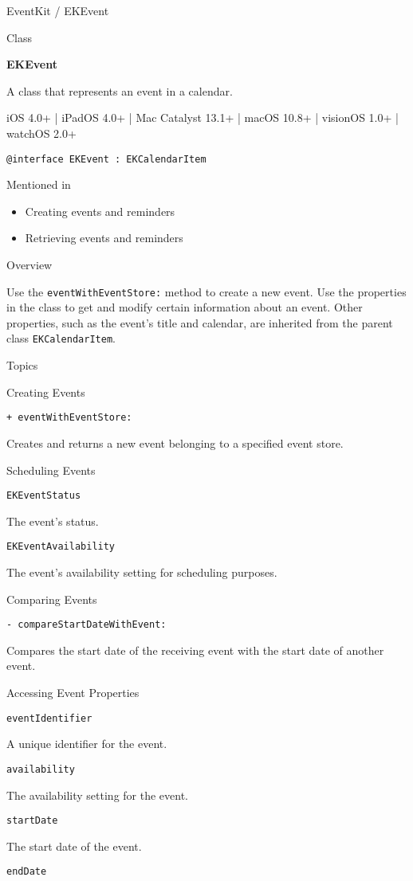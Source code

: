 \documentclass{article}
\title{}
\author{}
\date{}
\begin{document}
EventKit / EKEvent

Class

\textbf{EKEvent}

A class that represents an event in a calendar.

iOS 4.0+ | iPadOS 4.0+ | Mac Catalyst 13.1+ | macOS 10.8+ | visionOS 1.0+ | watchOS 2.0+

\texttt{@interface EKEvent : EKCalendarItem}

Mentioned in
\begin{itemize}
    \item Creating events and reminders
    \item Retrieving events and reminders
\end{itemize}

Overview

Use the \texttt{eventWithEventStore:} method to create a new event. Use the properties in the class to get and
modify certain information about an event. Other properties, such as the event's title and calendar, are inherited
from the parent class \texttt{EKCalendarItem}.

Topics

Creating Events

\texttt{+ eventWithEventStore:}

Creates and returns a new event belonging to a specified event store.

Scheduling Events

\texttt{EKEventStatus}

The event's status.

\texttt{EKEventAvailability}

The event's availability setting for scheduling purposes.

Comparing Events

\texttt{- compareStartDateWithEvent:}

Compares the start date of the receiving event with the start date of another event.

Accessing Event Properties

\texttt{eventIdentifier}

A unique identifier for the event.

\texttt{availability}

The availability setting for the event.

\texttt{startDate}

The start date of the event.

\texttt{endDate}
\end{document}
